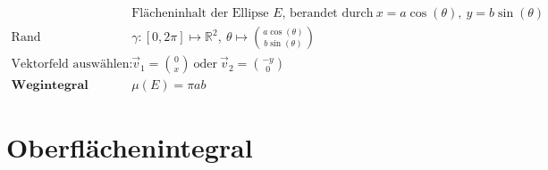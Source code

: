 \documentclass[11pt]{article}
\begin{document}
\begin{equation*}
\begin{split}
	& \text{Fl{\"a}cheninhalt der Ellipse $E$, berandet durch}\ x = a\cos(\theta),\ y = b\sin(\theta) \\
	\text{Rand parametrisieren:}\quad & \gamma: [0, 2\pi] \mapsto \mathbb{R}^2,\ \theta \mapsto \binom{a\cos(\theta)}{b\sin(\theta)} \\
	\text{Vektorfeld ausw{\"a}hlen:}\quad & \vec{v}_1 = \binom{0}{x}\ \text{oder}\ \vec{v}_2 = \binom{-y}{0} \\
	\textbf{Wegintegral ausrechnen:}\quad & \mu(E) = \pi ab
\end{split}
\end{equation*}

\section{Oberfl{\"a}chenintegral}
\end{document}
